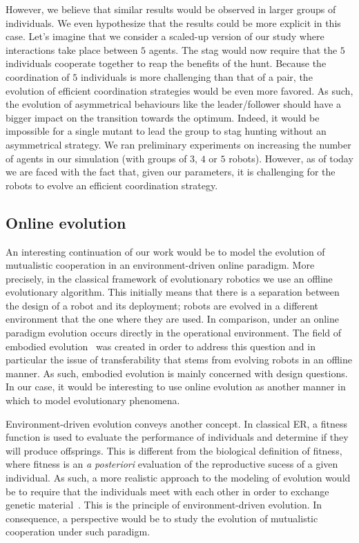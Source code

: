 			However, we believe that similar results would be observed in larger groups of individuals. We even hypothesize that the results could be more explicit in this case. Let's imagine that we consider a scaled-up version of our study where interactions take place between $5$ agents. The stag would now require that the $5$ individuals cooperate together to reap the benefits of the hunt. Because the coordination of $5$ individuals is more challenging than that of a pair, the evolution of efficient coordination strategies would be even more favored. As such, the evolution of asymmetrical behaviours like the leader/follower should have a bigger impact on the transition towards the optimum. Indeed, it would be impossible for a single mutant to lead the group to stag hunting without an asymmetrical strategy. We ran preliminary experiments on increasing the number of agents in our simulation (with groups of $3$, $4$ or $5$ robots). However, as of today we are faced with the fact that, given our parameters, it is challenging for the robots to evolve an efficient coordination strategy.


		\subsection{Online evolution}

			An interesting continuation of our work would be to model the evolution of mutualistic cooperation in an environment-driven online paradigm. More precisely, in the classical framework of evolutionary robotics we use an offline evolutionary algorithm. This initially means that there is a separation between the design of a robot and its deployment; robots are evolved in a different environment that the one where they are used. In comparison, under an online paradigm evolution occurs directly in the operational environment. The field of embodied evolution~\parencite{Watson2002} was created in order to address this question and in particular the issue of transferability that stems from evolving robots in an offline manner. As such, embodied evolution is mainly concerned with design questions. In our case, it would be interesting to use online evolution as another manner in which to model evolutionary phenomena. 

			Environment-driven evolution conveys another concept. In classical ER, a fitness function is used to evaluate the performance of individuals and determine if they will produce offsprings. This is different from the biological definition of fitness, where fitness is an \emph{a posteriori} evaluation of the reproductive sucess of a given individual. As such, a more realistic approach to the modeling of evolution would be to require that the individuals meet with each other in order to exchange genetic material~\parencite{Bredeche2010}. This is the principle of environment-driven evolution. In consequence, a perspective would be to study the evolution of mutualistic cooperation under such paradigm.

